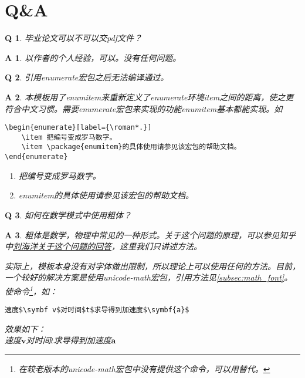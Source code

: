\documentclass[oneside]{LZU}
\newcommand{\package}[1]{{\sffamily #1}}
\newtheorem*{answer}{A}
\newtheorem{question}{Q}
\begin{document}
\section{Q\&A}
\begin{question}
    毕业论文可以不可以交pdf文件？
\end{question}
\begin{answer}
    以作者的个人经验，可以。没有任何问题。
\end{answer}
\begin{question}
    引用\package{enumerate}宏包之后无法编译通过。
\end{question}
\begin{answer}
    本模板用了\package{enumitem}来重新定义了enumerate环境item之间的距离，使之更符合中文习惯。需要\package{enumerate}宏包来实现的功能\package{enumitem}基本都能实现。如
\begin{verbatim}
\begin{enumerate}[label={\roman*.}]
    \item 把编号变成罗马数字。
    \item \package{enumitem}的具体使用请参见该宏包的帮助文档。
\end{enumerate}
\end{verbatim}
    \begin{enumerate}[label={\roman*.}]
        \item 把编号变成罗马数字。
        \item \package{enumitem}的具体使用请参见该宏包的帮助文档。
    \end{enumerate}
\end{answer}
\begin{question}
    如何在数学模式中使用粗体？
\end{question}
\begin{answer}
    粗体是数学，物理中常见的一种形式。关于这个问题的原理，可以参见知乎中\href{https://www.zhihu.com/question/25290041/answer/30422583}{刘海洋关于这个问题的回答}\supercite{mathboldfont}，这里我们只讲述方法。

    实际上，模板本身没有对字体做出限制，所以理论上可以使用任何的方法。目前，一个较好的解决方案是使用\package{unicode-math}宏包，引用方法见\cref{subsec:math_font}。使\texttt{\symbf}命令\footnote{在较老版本的\package{unicode-math}宏包中没有提供这个命令，可以用\texttt{\mathbf}替代。}，如：
\begin{verbatim}
速度$\symbf v$对时间$t$求导得到加速度$\symbf{a}$
\end{verbatim}
效果如下：\\
速度$\symbf v$对时间$t$求导得到加速度$\symbf{a}$
\end{answer}
\end{document}
